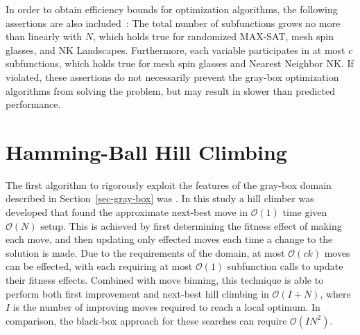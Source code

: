 \documentclass{sig-alternate}
\newcommand{\BigO}[1]{$\mathcal{O}{(#1)}$}
\begin{document}
In order to obtain efficiency bounds for optimization algorithms, the following
assertions are also included~\cite{chicano:2014:ball}: The total number of subfunctions grows no more than
linearly with $N$, which holds true for randomized MAX-SAT, mesh spin glasses, and NK Landscapes.
Furthermore, each variable participates in at most $c$ subfunctions, which holds true
for mesh spin glasses and Nearest Neighbor NK. If violated, these assertions do not
necessarily prevent the gray-box optimization algorithms from solving the problem, but may result
in slower than predicted performance.
\begin{comment}
We also include the trivial requirements that all problem variables must participate
in at least one subfunction and that the problem is not separable. Any problem which
violates these requirements can be restated either using fewer variables or as multiple separate problems.
\end{comment}

\section{Hamming-Ball Hill Climbing}
\label{sec-hamming}
The first algorithm to rigorously exploit the features of the gray-box domain
described in Section~\ref{sec-gray-box} was \cite{whitley:2013:greedy}. In this study
a hill climber was developed that found the approximate next-best move in \BigO{1} time given
\BigO{N} setup.
This is achieved by first determining the fitness effect of making each move, and then updating
only effected moves each time a change to the solution is made. Due to the requirements of the domain,
at most \BigO{ck} moves can be effected, with each requiring at most \BigO{1} subfunction calls
to update their fitness effects. Combined with move binning, this technique is able to perform both
first improvement and next-best hill climbing in \BigO{I+N}, where $I$ is the number of improving
moves required to reach a local optimum. In comparison, the black-box approach for these searches can require
\BigO{IN^2}.
\end{document}
